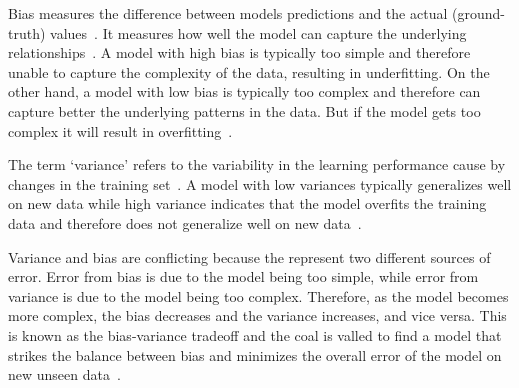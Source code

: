 Bias measures the difference between models predictions and the actual
(ground-truth) values~\cite[p. 51]{zhou_machinelearning_2021}.
It measures how well the model can capture the underlying
relationships~\cite[p. 7--8]{neal_biasvariancetradeofftextbooks_2019}.
A model with high bias is typically too simple and therefore unable to capture the complexity of the data, resulting
in underfitting.
On the other hand, a model with low bias is typically too complex and therefore can capture better the underlying
patterns in the data. But if the model gets too complex it will result in
overfitting~\cite[p. 20]{neal_biasvariancetradeofftextbooks_2019}.

The term `variance' refers to the variability in the learning performance cause by changes in the training
set~\cite[p. 51]{zhou_machinelearning_2021}.
A model with low variances typically generalizes well on new data while high variance indicates that the model
overfits the training data and therefore does not generalize well on new
data~\cite[p. 7--8]{neal_biasvariancetradeofftextbooks_2019}.

Variance and bias are conflicting because the represent two different sources of error.
Error from bias is due to the model being too simple, while error from variance is due to the model being too
complex.
Therefore, as the model becomes more complex, the bias decreases and the variance increases, and vice versa.
This is known as the bias-variance tradeoff and the coal is valled to find a model that strikes the balance between
bias and minimizes the overall error of the model on new unseen
data~\cite[p. 9]{neal_biasvariancetradeofftextbooks_2019}.


%



